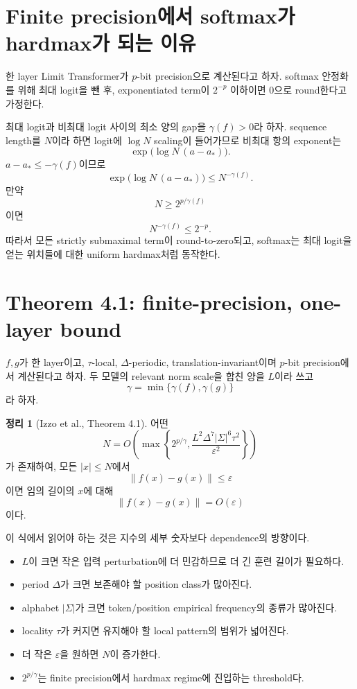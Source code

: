 \documentclass[11pt,a4paper,oneside,openany]{memoir}
\newcommand{\norm}[1]{\left\lVert #1\right\rVert}
\theoremstyle{definition}
\newtheorem{theorem}{정리}[chapter]
\begin{document}
\section{Finite precision에서 softmax가 hardmax가 되는 이유}

한 layer Limit Transformer가 $p$-bit precision으로 계산된다고 하자.
softmax 안정화를 위해 최대 logit을 뺀 후, exponentiated term이 $2^{-p}$ 이하이면 0으로 round한다고 가정한다.

최대 logit과 비최대 logit 사이의 최소 양의 gap을 $\gamma(f)>0$라 하자.
sequence length를 $N$이라 하면 logit에 $\log N$ scaling이 들어가므로 비최대 항의 exponent는
\[
\exp\bigl(\log N\,(a-a_*)\bigr).
\]
$a-a_*\le-\gamma(f)$이므로
\[
\exp\bigl(\log N\,(a-a_*)\bigr)
\le N^{-\gamma(f)}.
\]
만약
\[
N\ge 2^{p/\gamma(f)}
\]
이면
\[
N^{-\gamma(f)}\le 2^{-p}.
\]
따라서 모든 strictly submaximal term이 round-to-zero되고,
softmax는 최대 logit을 얻는 위치들에 대한 uniform hardmax처럼 동작한다.

\section{Theorem 4.1: finite-precision, one-layer bound}

$f,g$가 한 layer이고, $\tau$-local, $\Delta$-periodic, translation-invariant이며 $p$-bit precision에서 계산된다고 하자.
두 모델의 relevant norm scale을 합친 양을 $L$이라 쓰고
\[
\gamma=\min\{\gamma(f),\gamma(g)\}
\]
라 하자.

\begin{theorem}[Izzo et al., Theorem 4.1]
어떤
\[
N
=O\!\left(
\max\left\{
2^{p/\gamma},
\frac{L^2\Delta^7|\Sigma|^6\tau^2}{\varepsilon^2}
\right\}
\right)
\]
가 존재하여, 모든 $|x|\le N$에서
\[
\norm{f(x)-g(x)}\le\varepsilon
\]
이면 임의 길이의 $x$에 대해
\[
\norm{f(x)-g(x)}=O(\varepsilon)
\]
이다.
\end{theorem}

이 식에서 읽어야 하는 것은 지수의 세부 숫자보다 dependence의 방향이다.

\begin{itemize}
\item $L$이 크면 작은 입력 perturbation에 더 민감하므로 더 긴 훈련 길이가 필요하다.
\item period $\Delta$가 크면 보존해야 할 position class가 많아진다.
\item alphabet $|\Sigma|$가 크면 token/position empirical frequency의 종류가 많아진다.
\item locality $\tau$가 커지면 유지해야 할 local pattern의 범위가 넓어진다.
\item 더 작은 $\varepsilon$을 원하면 $N$이 증가한다.
\item $2^{p/\gamma}$는 finite precision에서 hardmax regime에 진입하는 threshold다.
\end{itemize}
\end{document}
